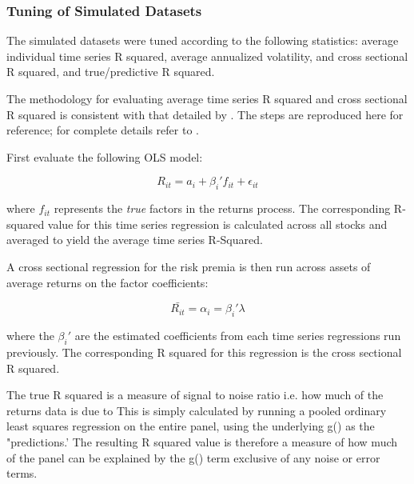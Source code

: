 \documentclass[11pt, a4paper, table]{article}
\begin{document}
\subsubsection{Tuning of Simulated Datasets}

The simulated datasets were tuned according to the following statistics: average individual time series R squared, average annualized volatility, and cross sectional R squared, and true/predictive R squared.

The methodology for evaluating average time series R squared and cross sectional R squared is consistent with that detailed by \cite{cochrane_asset_2005}. The steps are reproduced here for reference; for complete details refer to \cite{cochrane_asset_2005}.

First evaluate the following OLS model:

\begin{equation}
	R_{it} = a_i + \beta_i' f_{it} + \epsilon_{it} 
\end{equation}

where $f_{it}$ represents the \textit{true} factors in the returns process. The corresponding R-squared value for this time series regression is calculated across all stocks and averaged to yield the average time series R-Squared. 

A cross sectional regression for the risk premia is then run across assets of average returns on the factor coefficients:

\begin{equation}
	\bar{R_{it}} = \alpha_i = \beta_i' \lambda
\end{equation}

where the $\beta_i'$ are the estimated coefficients from each time series regressions run previously. The corresponding R squared for this regression is the cross sectional R squared.

The true R squared is a measure of signal to noise ratio i.e. how much of the returns data is due to 
This is simply calculated by running a pooled ordinary least squares regression on the entire panel, using the underlying g() as the "predictions.' The resulting R squared value is therefore a measure of how much of the panel can be explained by the g() term exclusive of any noise or error terms.




\end{document}
